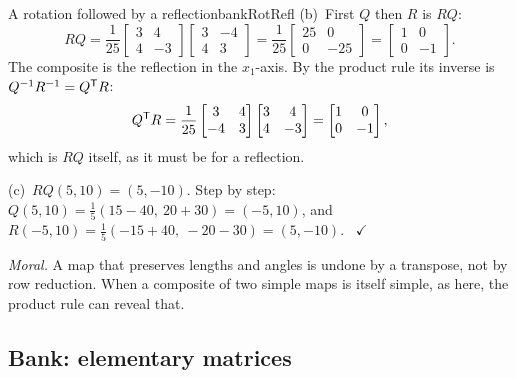 \documentclass[11pt]{article}
\begin{document}
\begin{exmp}{A rotation followed by a reflection}{bankRotRefl}
(b)~First $Q$ then $R$ is $RQ$:
\[
RQ=\frac1{25}\begin{bmatrix}3&4\\4&-3\end{bmatrix}\begin{bmatrix}3&-4\\4&3\end{bmatrix}=\frac1{25}\begin{bmatrix}25&0\\0&-25\end{bmatrix}=\begin{bmatrix}1&0\\0&-1\end{bmatrix}.
\]
The composite is the reflection in the $x_1$-axis. By the product rule its inverse is $Q^{-1}R^{-1}=Q^{\mathsf T} R$:
\[
Q^{\mathsf T} R=\frac1{25}\begin{bmatrix}3&4\\-4&3\end{bmatrix}\begin{bmatrix}3&4\\4&-3\end{bmatrix}=\begin{bmatrix}1&0\\0&-1\end{bmatrix},
\]
which is $RQ$ itself, as it must be for a reflection.

(c)~$RQ(5,10)=(5,-10)$. Step by step: $Q(5,10)=\frac15(15-40,\ 20+30)=(-5,10)$, and $R(-5,10)=\frac15(-15+40,\ -20-30)=(5,-10)$. \ $\checkmark$

\emph{Moral.} A map that preserves lengths and angles is undone by a transpose, not by row reduction. When a composite of two simple maps is itself simple, as here, the product rule can reveal that.
\end{exmp}

\subsection*{Bank: elementary matrices}
\end{document}
